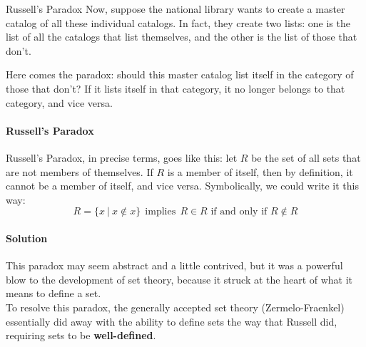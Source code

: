 \begin{proc}{Russell's Paradox}
Now, suppose the national library wants to create a master catalog of all these individual catalogs.  In fact, they create two lists: one is the list of all the catalogs that list themselves, and the other is the list of those that don't.

Here comes the paradox: should this master catalog list itself in the category of those that don't?  If it lists itself in that category, it no longer belongs to that category, and vice versa.\\

\paragraph{Russell's Paradox} Russell's Paradox, in precise terms, goes like this: let $R$ be the set of all sets that are not members of themselves.  If $R$ is a member of itself, then by definition, it cannot be a member of itself, and vice versa.  Symbolically, we could write it this way:
\[R = \{x\ |\ x \notin x\} \ \ \textrm{implies}\ \ R \in R \textrm{ if and only if } R \notin R\]

\paragraph{Solution} This paradox may seem abstract and a little contrived, but it was a powerful blow to the development of set theory, because it struck at the heart of what it means to define a set.\\

To resolve this paradox, the generally accepted set theory (Zermelo-Fraenkel) essentially did away with the ability to define sets the way that Russell did, requiring sets to be \textbf{well-defined}.
\end{proc}